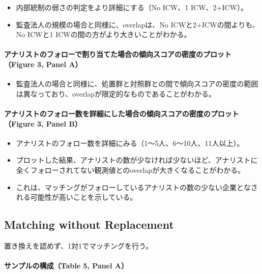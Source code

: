 \begin{itemize}
 \item 内部統制の弱さの判定をより詳細にする（No ICW、1 ICW、2+ICW）。
 \item 監査法人の規模の場合と同様に、overlapは、No ICWと2+ICWの間よりも、No ICWと1 ICWの間の方がより大きいことがわかる。
\end{itemize}

\paragraph{アナリストのフォローで割り当てた場合の傾向スコアの密度のプロット（Figure 3, Panel A）}

\begin{itemize}
 \item 監査法人の場合と同様に、処置群と対照群との間で傾向スコアの密度の範囲は異なっており、overlapが限定的なものであることがわかる。
\end{itemize}

\paragraph{アナリストのフォロー数を詳細にした場合の傾向スコアの密度のプロット（Figure 3, Panel B）}

\begin{itemize}
 \item アナリストのフォロー数を詳細にみる（1〜5人、6〜10人、11人以上）。
 \item プロットした結果、アナリストの数が少なければ少ないほど、アナリストに全くフォローされてない観測値とのoverlapが大きくなることがわかる。
 \item これは、マッチングがフォローしているアナリストの数の少ない企業となされる可能性が高いことを示している。
\end{itemize}

\subsection*{Matching without Replacement}

置き換えを認めず、1対1でマッチングを行う。

\paragraph{サンプルの構成（Table 5, Panel A）}


